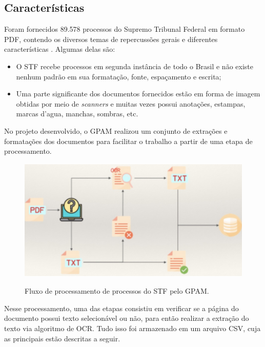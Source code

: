 \subsection{Características}

Foram fornecidos 89.578 processos do Supremo Tribunal Federal em formato PDF, contendo os diversos temas de repercussões gerais e diferentes características \cite{cnn-for-STF}. Algumas delas são:

\begin{itemize}
  \item O STF recebe processos em segunda instância de todo o Brasil e não existe nenhum padrão em sua formatação, fonte, espaçamento e escrita;
  \item Uma parte significante dos documentos fornecidos estão em forma de imagem obtidas por meio de \textit{scanners} e muitas vezes possui anotações, estampas, marcas d'agua, manchas, sombras, etc.
\end{itemize}


No projeto desenvolvido, o GPAM realizou um conjunto de extrações e formatações dos documentos para facilitar o trabalho a partir de uma etapa de processamento.
\\

\begin{figure}[H]
  \centering
  \caption{Fluxo de processamento de processos do STF pelo GPAM.}
  \includegraphics[width=13cm, center]{figuras/gpan-pipeline.png}
  \label{fig:gpan-pipeline}
\end{figure}

Nesse processamento, uma das etapas consistiu em verificar se a página do documento possui texto selecionável ou não, para então realizar a extração do texto via algoritmo de OCR. Tudo isso foi armazenado em um arquivo CSV, cuja as principais estão descritas a seguir.

